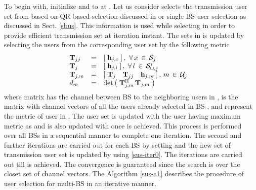 To begin with, initialize  and  to \me{\emptyset} at . Let us consider  selects the transmission user set  from  based on QR based selection discussed in \cite{zhang2007user,sun2009eigenmode} or single BS user selection as discussed in Sect. \ref{sbus}. This information is used while selecting  in order to provide efficient transmission set  at  iteration instant. The sets in  is updated by selecting the users from the corresponding user set  by the following metric
\begin{eqnarray}
\begin{array}{lll}
\mathbf{T}_{jj} &=& \left [ \; \mathbf{h}_{\mathit{j},\mathit{x}} \; \right ], \, \, \forall \, x \, \in \, \mathcal{S}_{j} \\
\mathbf{T}_j &=& \left [ \; \mathbf{h}_{\mathit{j},\mathit{l}} \; \right ], \, \, \forall \, l \, \in \, \mathcal{S}^i_{\cup,j} \\
\mathbf{T}_{j,m} &=& \left [ \; \mathbf{T}_j \quad \mathbf{T}_{jj} \quad \mathbf{h}_{\mathit{j},\mathit{m}} \; \right ], \, m \, \in \, \mathcal{U}_j \\
d_m &=& \det{ \left ( \; \mathbf{T}^{\mathrm{H}}_{j,m} \, \mathbf{T}_{j,m} \; \right ) }
\end{array}
\label{sus-iter0}
\end{eqnarray} 
where  matrix has the channel between BS  to the neighboring users in ,  is the matrix with channel vectors of all the users already selected in BS , and  represent the metric of  user in . The user set  is updated with the user having maximum metric  as  and  is also updated with  once  is achieved. This process is performed over all BSs in a sequential manner to complete one iteration. The second and further iterations are carried out for each BS  by setting  and the new set of transmission user set  is updated by using \eqref{sus-iter0}. The iterations are carried out till  is achieved. The convergence is guaranteed since the search is over the closet set of channel vectors. The Algorithm \ref{sus-a1} describes the procedure of user selection for multi-BS in an iterative manner.
